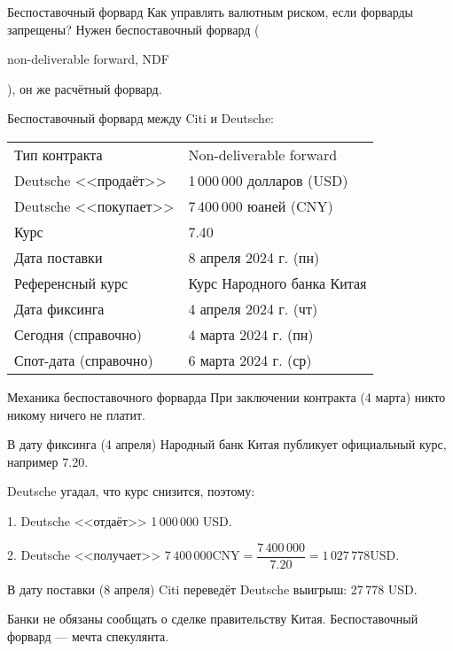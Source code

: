 \documentclass{beamer}
\newcommand{\en}[1]{\begin{otherlanguage}{english}#1\end{otherlanguage}}
\begin{document}
\begin{frame}{Беспоставочный форвард}
\justify
Как управлять валютным риском, если форварды запрещены? Нужен \alert{беспоставочный форвард} (\en{non-deliverable forward, NDF}), он же расчётный форвард.

\justify
Беспоставочный форвард между Citi и Deutsche:

\justify
\centering
\begin{tabular}{l|l}
	Тип контракта 		   & Non-deliverable forward		\\
	Deutsche <<продаёт>>  & 1\,000\,000 долларов (USD)	\\
	Deutsche <<покупает>> & 7\,400\,000 юаней (CNY)		\\
	Курс		 		      & 7.40 						\\
	Дата поставки		   & 8 апреля 2024 г. (пн) \\
	Референсный курс	   & Курс Народного банка Китая	\\
	Дата фиксинга		   & 4 апреля 2024 г. (чт) \\
	Сегодня (справочно)	& 4 марта 2024 г. (пн) \\
	Спот-дата (справочно) & 6 марта 2024 г. (ср)
\end{tabular}
\end{frame}



\begin{frame}{Механика беспоставочного форварда}
\justify
При заключении контракта (4 марта) никто никому ничего не платит.

\justify
В дату фиксинга (4 апреля) Народный банк Китая публикует официальный курс, например 7.20.

\justify
Deutsche угадал, что курс снизится, поэтому:

1. Deutsche <<отдаёт>> 1\,000\,000 USD.

2. Deutsche <<получает>> $7\,400\,000 \text{CNY} = \dfrac{7\,400\,000}{7.20} = 1\,027\,778 \text{USD}$.

\justify
В дату поставки (8 апреля) Citi переведёт Deutsche выигрыш: 27\,778 USD.

\justify Банки не обязаны сообщать о сделке правительству Китая. Беспоставочный форвард --- мечта спекулянта.
\end{frame}
\end{document}

